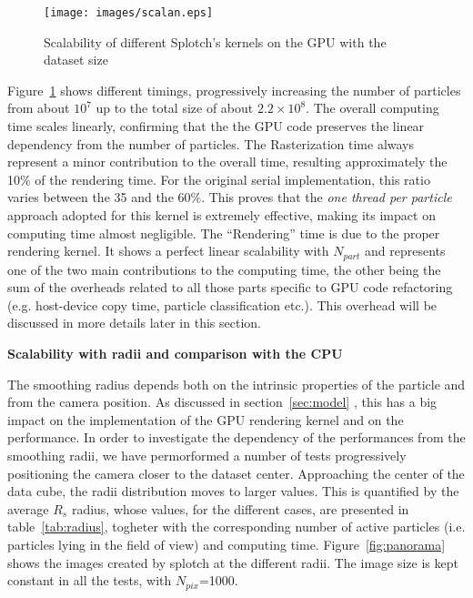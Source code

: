 \documentclass[11pt]{article}
\begin{document}
\begin{figure}
\centering
\texttt{[image: images/scalan.eps]}
\caption{Scalability of different Splotch's kernels on the GPU with the dataset size}
\label{fig:scalability}
\end{figure}

Figure~\ref{fig:scalability} shows different timings, progressively increasing the number of particles
from about $10^7$ up to the total size of about $2.2\times 10^8$. 
The overall computing time scales linearly, 
confirming that the the GPU code preserves the linear dependency from the 
number of particles. 
The Rasterization time always represent 
a minor contribution to the overall time, resulting approximately the 10\% of the rendering 
time. For the original serial implementation, this ratio varies between the 35 and the 60\%.
This proves that the {\it one thread per particle} approach adopted for this kernel
is extremely effective, making its impact on computing time almost negligible.
The ``Rendering'' time 
is due to the proper rendering kernel. It shows a perfect linear scalability
with $N_{part}$ and represents one of the two main contributions
to the computing time, the other being the sum of the overheads related to all those 
parts specific to GPU code refactoring 
(e.g. host-device copy time, particle classification etc.). 
This overhead  will be discussed in more details later in this section.

\medskip
\noindent
{\bf Scalability with radii and comparison with the CPU}

The smoothing radius depends both on the intrinsic properties of the particle
and from the camera position. 
As discussed in section~\ref{sec:model} , this has a big impact 
on the implementation of the GPU rendering kernel and
on the performance. In order to investigate the dependency of the performances from
the smoothing radii, we have permorformed a number of tests progressively 
positioning the camera closer to the dataset center. 
Approaching the center of the 
data cube, the radii distribution moves to larger values. This is quantified 
by the average $R_s$ radius, whose values, for the different cases, are presented in 
table~\ref{tab:radius}, togheter with the corresponding number of active particles 
(i.e. particles lying in the field of view) and computing time. 
Figure~\ref{fig:panorama} shows the images created by splotch at the different radii.
The image size is kept constant in all the tests, with $N_{pix}$=1000.
\end{document}

